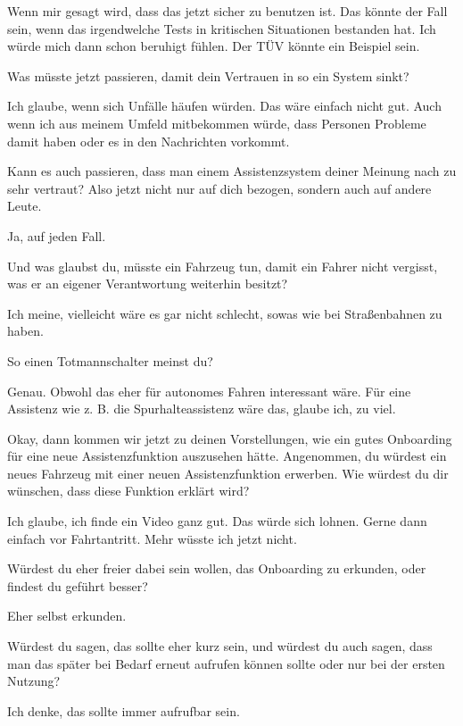 Wenn mir gesagt wird, dass das jetzt sicher zu benutzen ist. Das könnte
der Fall sein, wenn das irgendwelche Tests in kritischen Situationen
bestanden hat. Ich würde mich dann schon beruhigt fühlen. Der TÜV
könnte ein Beispiel sein.

\interviewerin
Was müsste jetzt passieren, damit dein Vertrauen in so ein System
sinkt?

Ich glaube, wenn sich Unfälle häufen würden. Das wäre einfach nicht gut.
Auch wenn ich aus meinem Umfeld mitbekommen würde, dass Personen
Probleme damit haben oder es in den Nachrichten vorkommt.

\interviewerin
Kann es auch passieren, dass man einem Assistenzsystem deiner Meinung
nach zu sehr vertraut? Also jetzt nicht nur auf dich bezogen, sondern
auch auf andere Leute.

Ja, auf jeden Fall.

\interviewerin
Und was glaubst du, müsste ein Fahrzeug tun, damit ein Fahrer nicht
vergisst, was er an eigener Verantwortung weiterhin besitzt?

Ich meine, vielleicht wäre es gar nicht schlecht, sowas wie bei
Straßenbahnen zu haben.

\interviewerin
So einen Totmannschalter meinst du?

Genau. Obwohl das eher für autonomes Fahren interessant wäre. Für eine
Assistenz wie z. B. die Spurhalteassistenz wäre das, glaube ich, zu
viel.

\interviewerin
Okay, dann kommen wir jetzt zu deinen Vorstellungen, wie ein gutes
Onboarding für eine neue Assistenzfunktion auszusehen hätte. Angenommen,
du würdest ein neues Fahrzeug mit einer neuen Assistenzfunktion
erwerben. Wie würdest du dir wünschen, dass diese Funktion erklärt
wird?

Ich glaube, ich finde ein Video ganz gut. Das würde sich lohnen. Gerne
dann einfach vor Fahrtantritt. Mehr wüsste ich jetzt nicht.

\interviewerin
Würdest du eher freier dabei sein wollen, das Onboarding zu erkunden,
oder findest du geführt besser?

Eher selbst erkunden.

\interviewerin
Würdest du sagen, das sollte eher kurz sein, und würdest du auch sagen,
dass man das später bei Bedarf erneut aufrufen können sollte oder nur
bei der ersten Nutzung?

Ich denke, das sollte immer aufrufbar sein.

